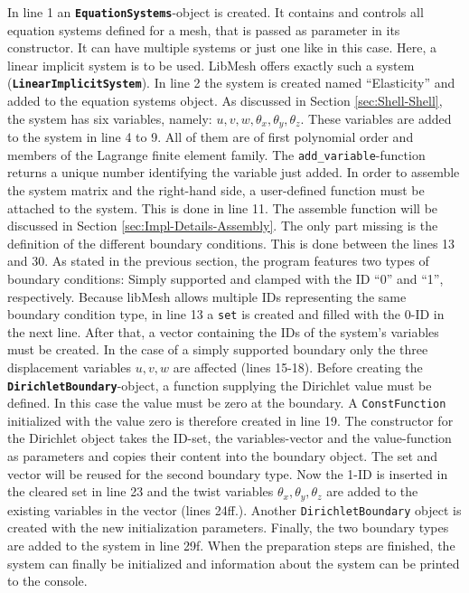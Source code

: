    In line 1 an \texttt{\textbf{EquationSystems}}-object is created. It contains and controls all equation systems defined for a mesh, that is passed as parameter in its constructor. It can have multiple systems or just one like in this case. Here, a linear implicit system is to be used. LibMesh offers exactly such a system (\texttt{\textbf{LinearImplicitSystem}}). In line 2 the system is created named ``Elasticity'' and added to the equation systems object. As discussed in Section \ref{sec:Shell-Shell}, the system has six variables, namely: $u, v, w, \theta_x, \theta_y, \theta_z$. These variables are added to the system in line 4 to 9. All of them are of first polynomial order and members of the Lagrange finite element family. The \texttt{add\_variable}-function returns a unique number identifying the variable just added. In order to assemble the system matrix and the right-hand side, a user-defined function must be attached to the system. This is done in line 11. The assemble function will be discussed in Section \ref{sec:Impl-Details-Assembly}. The only part missing is the definition of the different boundary conditions. This is done between the lines 13 and 30. As stated in the previous section, the program features two types of boundary conditions: Simply supported and clamped with the ID ``0'' and ``1'', respectively. Because libMesh allows multiple IDs representing the same boundary condition type, in line 13 a \texttt{set} is created and filled with the 0-ID in the next line. After that, a vector containing the IDs of the system's variables must be created. In the case of a simply supported boundary only the three displacement variables $u,v,w$ are affected (lines 15-18). Before creating the \texttt{\textbf{DirichletBoundary}}-object, a function supplying the Dirichlet value must be defined. In this case the value must be zero at the boundary. A \texttt{ConstFunction} initialized with the value zero is therefore created in line 19. The constructor for the Dirichlet object takes the ID-set, the variables-vector and the value-function as parameters and copies their content into the boundary object. The set and vector will be reused for the second boundary type. Now the 1-ID is inserted in the cleared set in line 23 and the twist variables $\theta_x, \theta_y, \theta_z$ are added to the existing variables in the vector (lines 24ff.). Another \texttt{DirichletBoundary} object is created with the new initialization parameters. Finally, the two boundary types are added to the system in line 29f. When the preparation steps are finished, the system can finally be initialized and information about the system can be printed to the console.
     

